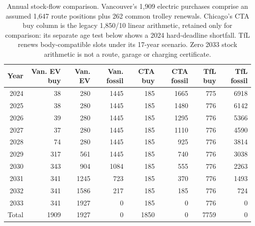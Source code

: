\begin{table}[htbp]
\centering
\begin{tabular}{@{}rrrrrrrr@{}}
\toprule
Year & Van. EV buy & Van. EV & Van. fossil & CTA buy & CTA fossil & TfL buy & TfL fossil\\
\midrule
2024 & 38 & 280 & 1445 & 185 & 1665 & 775 & 6918\\
2025 & 38 & 280 & 1445 & 185 & 1480 & 776 & 6142\\
2026 & 39 & 280 & 1445 & 185 & 1295 & 776 & 5366\\
2027 & 37 & 280 & 1445 & 185 & 1110 & 776 & 4590\\
2028 & 74 & 280 & 1445 & 185 & 925 & 776 & 3814\\
2029 & 317 & 561 & 1445 & 185 & 740 & 776 & 3038\\
2030 & 343 & 904 & 1084 & 185 & 555 & 776 & 2263\\
2031 & 341 & 1245 & 723 & 185 & 370 & 776 & 1493\\
2032 & 341 & 1586 & 217 & 185 & 185 & 776 & 724\\
2033 & 341 & 1927 & 0 & 185 & 0 & 776 & 0\\
\midrule
Total & 1909 & 1927 & 0 & 1850 & 0 & 7759 & 0\\
\bottomrule
\end{tabular}
\caption{Annual stock-flow comparison. Vancouver's 1,909 electric purchases comprise an assumed 1,647 route positions plus 262 common trolley renewals. Chicago's CTA buy column is the legacy 1,850/10 linear arithmetic, retained only for comparison: its separate age test below shows a 2024 hard-deadline shortfall. TfL renews body-compatible slots under its 17-year scenario. Zero 2033 stock arithmetic is not a route, garage or charging certificate.}
\end{table}
